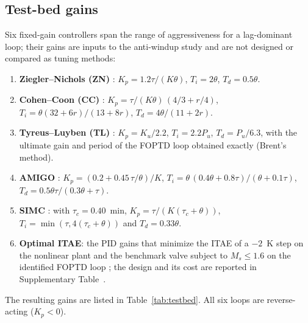 \subsection{Test-bed gains}
\label{subsec:tuning_rules}
Six fixed-gain controllers span the range of aggressiveness for a lag-dominant loop; their gains are inputs to the anti-windup study and are not designed or compared as tuning methods:
\begin{enumerate}
    \item \textbf{Ziegler--Nichols (ZN)} \cite{ziegler1942optimum}: $K_p = 1.2\tau/(K\theta)$, $T_i = 2\theta$, $T_d = 0.5\theta$.
    \item \textbf{Cohen--Coon (CC)} \cite{cohen1953theoretical}: $K_p = \tau/(K\theta)\,(4/3 + r/4)$, $T_i = \theta(32 + 6r)/(13 + 8r)$, $T_d = 4\theta/(11 + 2r)$.
    \item \textbf{Tyreus--Luyben (TL)} \cite{tyreus1992tuning, luyben2007chemical}: $K_p = K_u/2.2$, $T_i = 2.2P_u$, $T_d = P_u/6.3$, with the ultimate gain and period of the FOPTD loop obtained exactly (Brent's method).
    \item \textbf{AMIGO} \cite{astrom2004revisiting, astrom2006pid}: $K_p = (0.2 + 0.45\,\tau/\theta)/K$, $T_i = \theta\,(0.4\theta + 0.8\tau)/(\theta + 0.1\tau)$, $T_d = 0.5\theta\tau/(0.3\theta + \tau)$.
    \item \textbf{SIMC} \cite{skogestad2003simple, grimholt2018optimal}: with $\tau_c = 0.40$~min, $K_p = \tau/(K(\tau_c + \theta))$, $T_i = \min(\tau, 4(\tau_c + \theta))$ and $T_d = 0.33\theta$.
    \item \textbf{Optimal ITAE}: the PID gains that minimize the ITAE of a $-2$~K step on the nonlinear plant and the benchmark valve subject to $M_s \le 1.6$ on the identified FOPTD loop \cite{garpinger2014performance}; the design and its cost are reported in Supplementary Table~.
\end{enumerate}
The resulting gains are listed in Table~\ref{tab:testbed}. All six loops are reverse-acting ($K_p < 0$).
